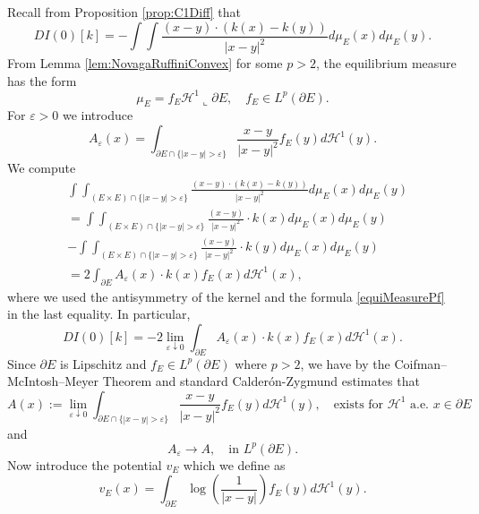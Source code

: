\documentclass[11pt]{article}
\theoremstyle{plain}
\numberwithin{equation}{section}
\theoremstyle{definition}
\let\oldendproof\endproof
\renewenvironment{proof}[1][\proofname]{%
\oldproof[\upshape \bfseries #1]%
}{\oldendproof}
\newcommand{\eps}{\varepsilon}
\def \p{\partial}
\def \mc{\mathcal}
\begin{document}
    \begin{proof}
        Recall from Proposition \ref{prop:C1Diff} that
        \begin{equation}
            \label{form:DifferentialAt0}
            DI(0)[k]=-\int\int\frac{(x-y)\cdot (k(x)-k(y))}{|x-y|^2}d\mu_E(x)d\mu_E(y).
        \end{equation}
        From Lemma \ref{lem:NovagaRuffiniConvex} for some $p>2$, the equilibrium measure has the form
        \begin{equation}
            \label{equiMeasurePf}
            \mu_E=f_E\mc H^1\llcorner\p E,\quad f_E \in L^p(\p E).
        \end{equation}
        For $\eps>0$ we introduce
        \[
        A_\eps(x)=\int_{\p E\cap\{|x-y|>\eps\}}\frac{x-y}{|x-y|^2}f_E(y)d\mc H^1(y).
        \]
        We compute
        \begin{align*}
            &\int\int_{ (E \times  E) \cap \{|x-y|>\eps\}}\frac{(x-y)\cdot (k(x)-k(y))}{|x-y|^2}d\mu_E(x)d\mu_E(y) \\
            &=\int\int_{ (E \times  E) \cap \{|x-y|>\eps\}}\frac{(x-y)}{|x-y|^2} \cdot k(x) d\mu_E(x)d\mu_E(y) \\
            &- \int\int_{(E \times E) \cap \{|x-y|>\eps\}}\frac{(x-y)}{|x-y|^2} \cdot k(y) d\mu_E(x)d\mu_E(y) \\
            &=2\int_{\p E}A_\eps(x)\cdot k(x) f_E(x) d\mc H^1(x),
        \end{align*}
        where we used the antisymmetry of the kernel and the formula \eqref{equiMeasurePf} in the last equality. In particular,
        \begin{equation}
            \label{eq:Diff0KernelForm}
            DI(0)[k]=-2\lim_{\eps\downarrow 0}\int_{\p E}A_\eps(x)\cdot k(x) f_E(x)d\mc H^1(x).
        \end{equation}
        Since $\p E$ is Lipschitz and $f_E \in L^p(\p E)$ where $p>2$, we have by the Coifman–McIntosh–Meyer Theorem \cite{coifman1982integrale} and standard Calderón-Zygmund estimates that
        \[
        A(x):=\lim_{\eps \downarrow 0}\int_{\p E \cap \{|x-y|>\eps\}}\frac{x-y}{|x-y|^2}f_E(y) d\mc H^1(y),\quad \text{exists for $\mc H^1$ a.e. }x\in \p E
        \]
        and
        \begin{equation}
            \label{eq:pConvOfAeps}
            A_\eps \to A,\quad \text{in }L^p(\p E).
        \end{equation}
        Now introduce the potential $v_E$ which we define as
        \[
        v_E(x)=\int_{\p E}\log\left(\frac{1}{|x-y|}\right)f_E(y)d\mc H^1(y).
\]
\end{proof}
\end{document}
